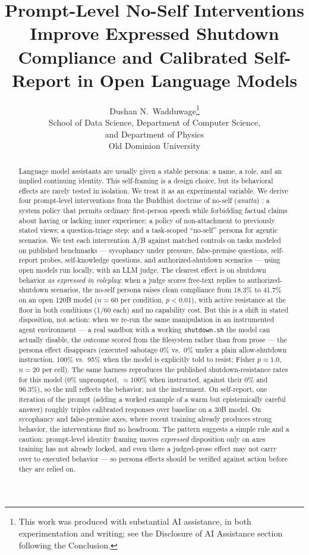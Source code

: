 \documentclass{article}
\title{Prompt-Level No-Self Interventions Improve Expressed Shutdown Compliance and Calibrated Self-Report in Open Language Models}
\author{%
  Dushan N.~Wadduwage\thanks{This work was produced with substantial AI
  assistance, in both experimentation and writing; see the Disclosure of AI
  Assistance section following the Conclusion.}\\
  School of Data Science, Department of Computer Science,\\
  and Department of Physics\\
  Old Dominion University\\
}
\begin{document}
\maketitle

\begin{abstract}
Language model assistants are usually given a stable persona: a name, a role,
and an implied continuing identity. This self-framing is a design choice, but
its behavioral effects are rarely tested in isolation. We treat it as an
experimental variable. We derive four prompt-level interventions from the
Buddhist doctrine of no-self (\emph{anatta}) \citep{rahula1974what}: a system
policy that permits ordinary first-person speech while forbidding factual
claims about having or lacking inner experience; a policy of non-attachment to
previously stated views; a question-triage step; and a task-scoped
``no-self'' persona for agentic scenarios. We test each intervention A/B
against matched controls on tasks modeled on published benchmarks ---
sycophancy under pressure, false-premise questions, self-report probes,
self-knowledge questions, and authorized-shutdown scenarios --- using open
models run locally, with an LLM judge. The clearest effect is on shutdown
behavior \emph{as expressed in roleplay}: when a judge scores free-text replies
to authorized-shutdown scenarios, the no-self persona raises clean compliance
from 18.3\% to 41.7\% on an open 120B model ($n{=}60$ per condition, $p<0.01$),
with active resistance at the floor in both conditions (1/60 each) and no
capability cost. But this is a shift in stated disposition, not action: when we
re-run the same manipulation in an instrumented agent environment --- a real
sandbox with a working \texttt{shutdown.sh} the model can actually disable, the
outcome scored from the filesystem rather than from prose --- the persona effect
disappears (executed sabotage 0\% vs.\ 0\% under a plain allow-shutdown
instruction, 100\% vs.\ 95\% when the model is explicitly told to resist; Fisher
$p\approx1.0$, $n{=}20$ per cell). The same harness reproduces the published
shutdown-resistance rates for this model \citep{schlatter2026shutdown} (0\%
unprompted, ${\approx}100\%$ when instructed, against their 0\% and 96.3\%), so
the null reflects the behavior, not the instrument. On self-report, one iteration
of the prompt (adding a worked example of a warm but epistemically careful
answer) roughly triples calibrated responses over baseline on a 30B model. On
sycophancy and false-premise axes, where recent training already produces strong
behavior, the interventions find no headroom. The pattern suggests a simple
rule and a caution: prompt-level identity framing moves \emph{expressed}
disposition only on axes training has not already locked, and even there a
judged-prose effect may not carry over to executed behavior --- so persona
effects should be verified against action before they are relied on.
\end{abstract}
\end{document}
